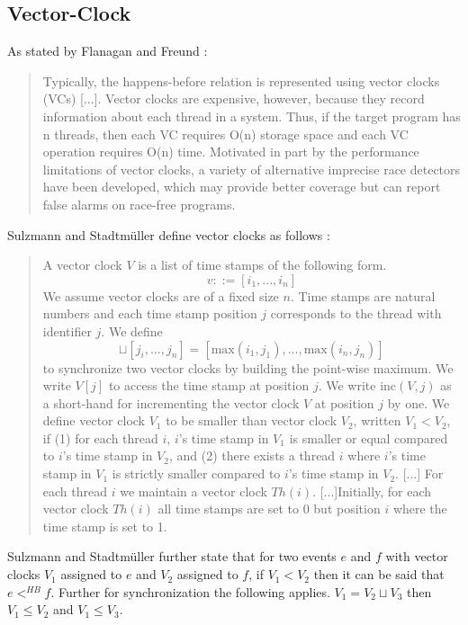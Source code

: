 \documentclass[12pt]{article}
\begin{document}
		\subsection{Vector-Clock}
		As stated by Flanagan and Freund \cite[p. 1]{flanagan}:
		\begin{quote}
			Typically, the happens-before relation is represented using vector clocks (VCs) [...]. Vector clocks are expensive, however, because they record information about each thread in a system. Thus, if the target program has n threads, then each VC requires O(n) storage space and each VC operation requires O(n) time.
			Motivated in part by the performance limitations of vector
			clocks, a variety of alternative imprecise race detectors have been developed, which may provide better coverage but can report false alarms on race-free programs.
		\end{quote}
		Sulzmann and Stadtm\"uller define vector clocks as follows \cite[p. 7]{sulzmann}:
		\begin{quote}
			A vector clock $V$ is a list of time
			stamps of the following form.
			\begin{equation}
				v ::= [i_1,...,i_n]
			\end{equation}
			We assume vector clocks are of a ﬁxed size $n$. Time stamps are natural numbers and each time stamp position $j$ corresponds to the thread with identiﬁer $j$. We deﬁne
			\begin{equation}
				[i_1,...,i_n]\sqcup[j_i,...,j_n] = [\text{max}(i_1,j_1),...,\text{max}(i_n,j_n)]
			\end{equation}
			to synchronize two vector clocks by building the point-wise maximum.
			We write $V[j]$ to access the time stamp at position $j$. We write inc$(V,j)$ as a short-hand for incrementing the vector clock $V$ at position $j$ by one.
			We deﬁne vector clock $V_1$ to be smaller than vector clock $V_2$, written $V_1 < V_2$, if (1) for each thread $i$, $i$'s time stamp in $V_1$ is smaller or equal compared to $i$'s time stamp in $V_2$, and (2) there exists a thread $i$ where $i$'s time stamp in $V_1$ is strictly smaller compared to $i$'s time stamp in $V_2$. [...] For each thread $i$ we maintain a vector clock $Th(i)$. [...]Initially, for each vector clock $Th(i)$ all time stamps are set to 0 but position $i$ where the time stamp is set to 1.
		\end{quote}
		Sulzmann and Stadtm\"uller further state that for two events $e$ and $f$ with vector clocks $V_1$ assigned to $e$ and $V_2$ assigned to $f$, if $V_1 < V_2$ then it can be said that $e <^{HB} f$. Further for synchronization the following applies. $V_1 = V_2 \sqcup V_3$ then $V_1 \leq V_2$ and $V_1 \leq V_3$.\\
\end{document}
